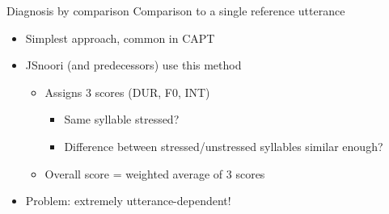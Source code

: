 \documentclass[xcolor={dvipsnames}]{beamer}
\begin{document}
		\begin{frame}{Diagnosis by comparison}
		Comparison to a single reference utterance
		
		
		\begin{center}
		\end{center}
		
		
		\begin{itemize}
		\item Simplest approach, common in CAPT%
		\item JSnoori (and predecessors) use this method
			\begin{itemize}
			\item Assigns 3 scores (DUR, F0, INT)
				\begin{itemize}
				\item Same syllable stressed?
				\item Difference between stressed/unstressed syllables similar enough?
				\end{itemize}
			\item Overall score = weighted average of 3 scores
			\end{itemize}
		\item Problem: extremely utterance-dependent!
		\end{itemize}
		\end{frame}
		
\end{document}
